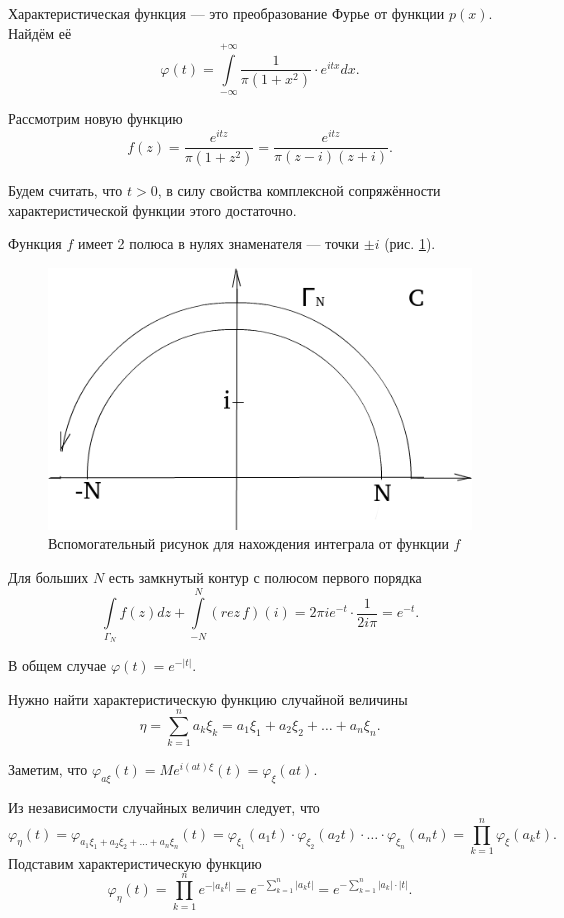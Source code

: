 Характеристическая функция --- это преобразование Фурье от функции $p \left( x \right) $.
Найдём её
$$ \varphi \left( t \right) =
  \int \limits_{- \infty }^{+ \infty } \frac{1}{ \pi \left( 1 + x^2 \right) } \cdot e^{itx} dx.$$

Рассмотрим новую функцию
$$f \left( z \right) =
  \frac{e^{itz}}{ \pi \left( 1 + z^2 \right) } =
  \frac{e^{itz}}{ \pi \left( z - i \right) \left( z + i \right) }.$$

Будем считать, что $t > 0$,
в силу свойства комплексной сопряжённости характеристической функции этого достаточно.

Функция $f$ имеет 2 полюса в нулях знаменателя --- точки $ \pm i$ (рис. \ref{fig:1522}).

\begin{figure}[h!]
  \centering
  \includegraphics[width=.4\textwidth]{./pictures/15_22.png}
  \caption{Вспомогательный рисунок для нахождения интеграла от функции $f$}
  \label{fig:1522}
\end{figure}

Для больших $N$ есть замкнутый контур с полюсом первого порядка
$$ \int \limits_{ \Gamma_N} f \left( z \right) dz +
\int \limits_{- N}^N \left( rez \, f \right) \left( i \right) =
  2 \pi ie^{- t} \cdot \frac{1}{2i \pi } =
  e^{- t}.$$

В общем случае $ \varphi \left( t \right) = e^{- \left| t \right| }$.

Нужно найти характеристическую функцию случайной величины
$$ \eta =
  \sum \limits_{k = 1}^n a_k \xi_k =
  a_1 \xi_1 + a_2 \xi_2 + \dotsc + a_n \xi_n.$$

Заметим, что
$ \varphi_{a \xi } \left( t \right) =
  Me^{i \left( at \right) \xi } \left( t \right) =
  \varphi_{ \xi } \left( at \right) $.

Из независимости случайных величин следует, что
$$ \varphi_{ \eta } \left( t \right) =
  \varphi_{a_1 \xi_1 + a_2 \xi_2 + \dotsc + a_n \xi_n} \left( t \right) =
  \varphi_{ \xi_1} \left( a_1 t \right) \cdot \varphi_{ \xi_2} \left( a_2 t \right) \cdot
  \dotsc \cdot \varphi_{ \xi_n} \left( a_n t \right) =
  \prod \limits_{k = 1}^n \varphi_{ \xi } \left( a_k t \right).$$
Подставим характеристическую функцию
$$ \varphi_{ \eta } \left( t \right) =
  \prod \limits_{k = 1}^n e^{- \left| a_k t \right| } =
  e^{- \sum \limits_{k = 1}^n \left| a_k t \right| } =
  e^{- \sum \limits_{k = 1}^n \left| a_k \right| \cdot \left| t \right| }.$$

